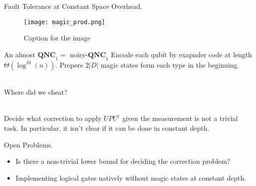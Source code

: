 \documentclass{beamer}
\newcommand*{\QNCon}{ \mathbf{QNC}_{1} }
\newcommand*{\noiseQNCon}{ noisy-$\QNCon$ }
\begin{document}
\begin{frame}{Fault Tolerance at Constant Space Overhead.}
\begin{figure}[h]
    \centering
    \texttt{[image: magic\_prod.png]}
    \caption{Caption for the image}
    \label{fig:your-label}
\end{figure}
\end{frame}

\begin{frame}{An almost $\QNCon =$ \noiseQNCon}
  Encode each qubit by exapnder code at length $\Theta(\log^{10}(n))$. Prepere $2|D|$ magic states form each type in the beginning. \\~\ 

Where did we cheat? \\~\

Decide what correction to apply $UPU^{\dagger}$ given the measurement is not a trivial task. In particular, it isn't clear if it can be done in constant depth.
\end{frame}


\begin{frame}{Open Problems.}
  \begin{itemize}
    \item Is there a non-trivial lower bound for deciding the correction problem?
    \item Implementing logical gates natively without magic states at constant depth.
  \end{itemize}
\end{frame}
\end{document}
